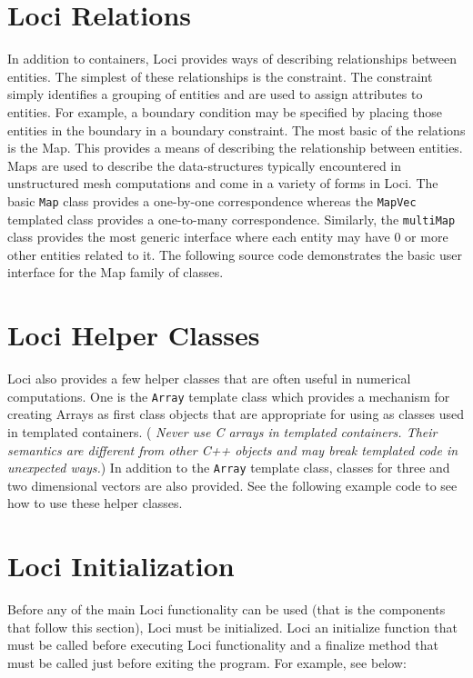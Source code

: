\documentclass[10pt,epsf]{book}
\begin{document}
\section{Loci Relations}
In addition to containers, Loci provides ways of describing
relationships between entities.  The simplest of these relationships
is the constraint.  The constraint simply identifies a grouping of
entities and are used to assign attributes to entities.  For example,
a boundary condition may be specified by placing those entities in the
boundary in a boundary constraint.  The most basic of the relations is
the Map.  This provides a means of describing the relationship between
entities.  Maps are used to describe the data-structures typically
encountered in unstructured mesh computations and come in a variety of
forms in Loci.  The basic {\tt Map} class provides a one-by-one
correspondence whereas the {\tt MapVec} templated class provides a
one-to-many correspondence.  Similarly, the {\tt multiMap} class
provides the most generic interface where each entity may have 0 or
more other entities related to it.  The following source code
demonstrates the basic user interface for the Map family of classes.




\section{Loci Helper Classes}

Loci also provides a few helper classes that are often useful in
numerical computations.  One is the {\tt Array} template class which provides a
mechanism for creating Arrays as first class objects that are
appropriate for using as classes used in templated containers. ({\it
Never use C arrays in templated containers.  Their semantics are
different from other C++ objects and may break templated code in
unexpected ways.})  In addition to the {\tt Array} template class,
classes for three and two dimensional vectors are also provided.  See
the following example code to see how to use these helper classes.



\section{Loci Initialization}

Before any of the main Loci functionality can be used (that is the
components that follow this section), Loci must be initialized.  Loci
an initialize function that must be called before executing Loci
functionality and a finalize method that must be called just before
exiting the program.  For example, see below:
\end{document}

